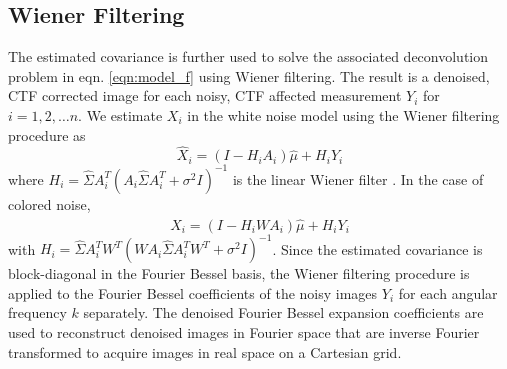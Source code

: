\documentclass[review]{elsarticle}
\begin{document}
\subsection{Wiener Filtering}
\label{sec:wf}
The estimated covariance is
further used to solve the associated deconvolution problem
in eqn. \ref{eqn:model_f} using Wiener filtering. The result is a denoised, CTF 
corrected image for each noisy, CTF affected
measurement $Y_i$ for $i=1,2,\ldots n$. We
estimate $X_i$ in the white noise model using the Wiener 
filtering procedure as
\begin{equation}
\hat X_i = (I-H_iA_{i})\hat\mu + H_iY_i 
\end{equation}
where $H_i = \hat \Sigma A_{i}^T ( A_{i} \hat \Sigma A_{i}^T + \sigma^2 
I)^{-1} $ is the linear Wiener filter \cite{wiener_deriv}. In the case of colored noise,
\begin{equation}
\hat X_i = (I-H_iWA_{i})\hat\mu + H_iY_i 
\end{equation}
with $H_i = \hat \Sigma A_{i}^T W^T (W A_{i} \hat \Sigma A_{i}^T W^T 
+ \sigma^2 I)^{-1}$. Since the estimated covariance
is block-diagonal in the Fourier Bessel basis, the Wiener filtering
procedure is applied to the Fourier Bessel coefficients of the noisy 
images $Y_i$ for each angular frequency $k$ separately. The denoised 
Fourier Bessel expansion coefficients
are used to reconstruct denoised images in Fourier space that are inverse Fourier 
transformed to acquire images in real space on a Cartesian grid.
\end{document}
